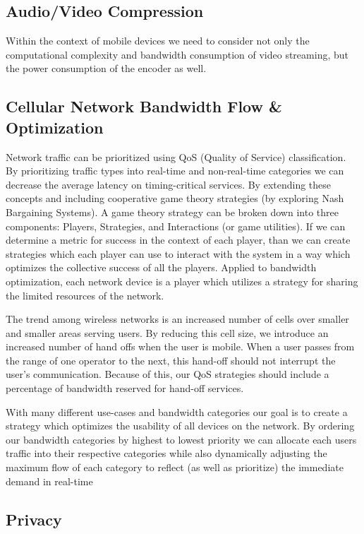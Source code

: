 \documentclass[a4paper,12pt]{report}
\begin{document}
\subsection{Audio/Video Compression}
\cite{4297087,4801602}

Within the context of mobile devices we need to consider not only the computational complexity and bandwidth consumption of video streaming, but the power consumption of the encoder as well.
\cite{5054795}
\subsection{Cellular Network Bandwidth Flow \& Optimization}

Network traffic can be prioritized using QoS (Quality of Service) classification. By prioritizing traffic types into real-time and non-real-time categories we can decrease the average latency on timing-critical services. By extending these concepts and including cooperative game theory strategies (by exploring Nash Bargaining Systems). A game theory strategy can be broken down into three components: Players, Strategies, and Interactions (or game utilities). If we can determine a metric for success in the context of each player, than we can create strategies which each player can use to interact with the system in a way which optimizes the collective success of all the players. Applied to bandwidth optimization, each network device is a player which utilizes a strategy for sharing the limited resources of the network.

The trend among wireless networks is an increased number of cells over smaller and smaller areas serving users. By reducing this cell size, we introduce an increased number of hand offs when the user is mobile. When a user passes from the range of one operator to the next, this hand-off should not interrupt the user's communication. Because of this, our QoS strategies should include a percentage of bandwidth reserved for hand-off services. 

With many different use-cases and bandwidth categories our goal is to create a strategy which optimizes the usability of all devices on the network. By ordering our bandwidth categories by highest to lowest priority we can allocate each users traffic into their respective categories while also dynamically adjusting the maximum flow of each category to reflect (as well as prioritize) the immediate demand in real-time
\cite{5710522,1300874,1376696}
\subsection{Privacy}
\cite{4698190,4471983}
\end{document}
